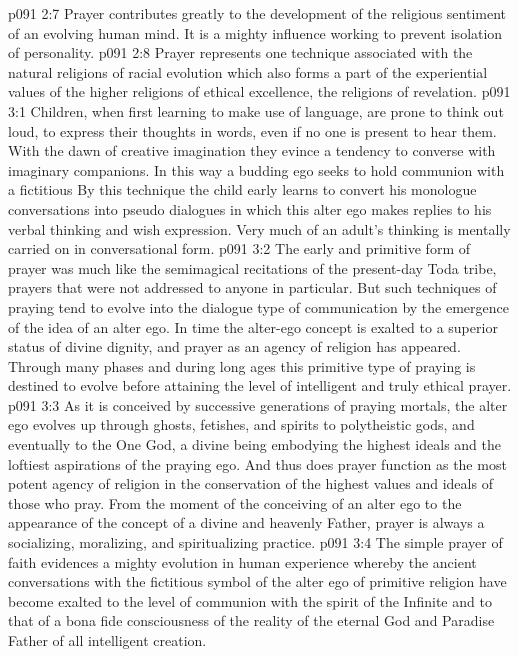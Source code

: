 \vs p091 2:7 Prayer contributes greatly to the development of the religious sentiment of an evolving human mind. It is a mighty influence working to prevent isolation of personality.
\vs p091 2:8 Prayer represents one technique associated with the natural religions of racial evolution which also forms a part of the experiential values of the higher religions of ethical excellence, the religions of revelation.
\vs p091 3:1 Children, when first learning to make use of language, are prone to think out loud, to express their thoughts in words, even if no one is present to hear them. With the dawn of creative imagination they evince a tendency to converse with imaginary companions. In this way a budding ego seeks to hold communion with a fictitious  By this technique the child early learns to convert his monologue conversations into pseudo dialogues in which this alter ego makes replies to his verbal thinking and wish expression. Very much of an adult’s thinking is mentally carried on in conversational form.
\vs p091 3:2 The early and primitive form of prayer was much like the semimagical recitations of the present\hyp{}day Toda tribe, prayers that were not addressed to anyone in particular. But such techniques of praying tend to evolve into the dialogue type of communication by the emergence of the idea of an alter ego. In time the alter\hyp{}ego concept is exalted to a superior status of divine dignity, and prayer as an agency of religion has appeared. Through many phases and during long ages this primitive type of praying is destined to evolve before attaining the level of intelligent and truly ethical prayer.
\vs p091 3:3 As it is conceived by successive generations of praying mortals, the alter ego evolves up through ghosts, fetishes, and spirits to polytheistic gods, and eventually to the One God, a divine being embodying the highest ideals and the loftiest aspirations of the praying ego. And thus does prayer function as the most potent agency of religion in the conservation of the highest values and ideals of those who pray. From the moment of the conceiving of an alter ego to the appearance of the concept of a divine and heavenly Father, prayer is always a socializing, moralizing, and spiritualizing practice.
\vs p091 3:4 The simple prayer of faith evidences a mighty evolution in human experience whereby the ancient conversations with the fictitious symbol of the alter ego of primitive religion have become exalted to the level of communion with the spirit of the Infinite and to that of a bona fide consciousness of the reality of the eternal God and Paradise Father of all intelligent creation.
